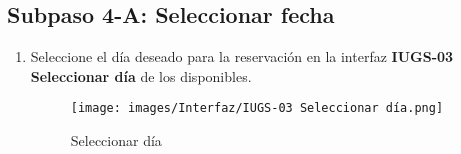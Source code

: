 \subsection{Subpaso 4-A: Seleccionar fecha}
\begin{enumerate}
	\item Seleccione el día deseado para la reservación en la interfaz
    \textbf{IUGS-03 Seleccionar día} de los disponibles.
    \begin{figure}[hbtp]
	\texttt{[image: images/Interfaz/IUGS-03 Seleccionar día.png]}
	\caption{Seleccionar día}
	\end{figure}
\end{enumerate}